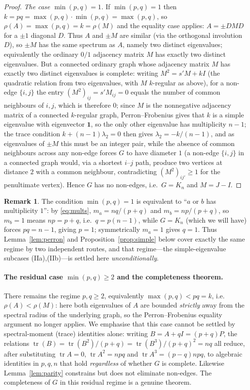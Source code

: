 \documentclass{amsart}
\theoremstyle{definition}
\newtheorem{remark}{Remark}
\begin{document}
\begin{proof}
\emph{The case $\min(p,q)=1$.} If $\min(p,q)=1$ then
$k=pq=\max(p,q)\cdot\min(p,q)=\max(p,q)$, so
$\rho(A)=\max(p,q)=k=\rho(M)$ and the equality case applies: $A=\pm DMD$ for a
$\pm1$ diagonal $D$. Thus $A$ and $\pm M$ are similar (via the orthogonal
involution $D$), so $\pm M$ has the same spectrum as $A$, namely two distinct
eigenvalues; equivalently the ordinary $0/1$ adjacency matrix $M$ has exactly
two distinct eigenvalues. But a connected ordinary graph whose adjacency matrix
$M$ has exactly two distinct eigenvalues is complete: writing $M^2=s'M+kI$ (the
quadratic relation from two eigenvalues, with $M$ $k$-regular as above), for a
non-edge $\{i,j\}$ the entry $(M^2)_{ij}=s'M_{ij}=0$ equals the number of common
neighbours of $i,j$, which is therefore $0$; since $M$ is the nonnegative
adjacency matrix of a connected $k$-regular graph, Perron--Frobenius gives that
$k$ is a simple eigenvalue with eigenvector $\mathbf1$, so the only other
eigenvalue has multiplicity $n-1$; the trace condition $k+(n-1)\lambda_2=0$ then
gives $\lambda_2=-k/(n-1)$, and as eigenvalues of $\pm M$ this must be an
integer pair, while the absence of common neighbours across any non-edge forces
$G$ to have diameter $1$ (a non-edge $\{i,j\}$ in a connected graph would, via a
shortest $i$--$j$ path, produce two vertices at distance $2$ with a common
neighbour, contradicting $(M^2)_{ij'}\ge1$ for the penultimate vertex). Hence
$G$ has no non-edges, i.e.\ $G=K_n$ and $M=J-I$.
\end{proof}

\begin{remark}\label{rem:perron-vs-simple}
The condition $\min(p,q)=1$ is equivalent to ``$a$ or $b$ has multiplicity
$1$'': by \eqref{eq:mults}, $m_a=nq/(p+q)$ and $m_b=np/(p+q)$, so $m_b=1$ means
$np=p+q$, i.e.\ $q=p(n-1)$, while $G=K_n$ (which we will have) forces $pq=n-1$,
giving $p=1$; symmetrically $m_a=1$ gives $q=1$. Thus Lemma~\ref{lem:perron}
and Proposition~\ref{prop:simple} below cover exactly the same regime by two
independent routes, and that regime---the simple-eigenvalue subcases
(IIa),(IIb)---is settled here \emph{unconditionally}.
\end{remark}

\paragraph{The residual case $\min(p,q)\ge2$ and the completeness theorem.}
There remains the regime $p,q\ge2$, equivalently $\max(p,q)<pq=k$, i.e.\
$\rho(A)<\rho(M)$: here both eigenvalues of $A$ are bounded \emph{strictly}
away from the spectral radius of the underlying graph, so the
Perron--Frobenius equality argument no longer applies. We emphasise that this
case cannot be settled by spectral-moment (trace) identities alone: writing
$B=A+qI=(p+q)P$, the relations
$\operatorname{tr}(B)=\operatorname{tr}(B^2)/(p+q)
=\operatorname{tr}(B^3)/(p+q)^2=nq$ all reduce, after substituting
$\operatorname{tr}A=0$, $\operatorname{tr}A^2=npq$ and
$\operatorname{tr}A^3=(p-q)npq$, to algebraic identities in $p,q,n$ that hold
\emph{regardless} of whether $G$ is complete. Likewise Lemma~\ref{lem:parity}
constrains but does not eliminate non-edges. The completeness of $G$ in this
residual regime is a genuine theorem.
\end{document}
